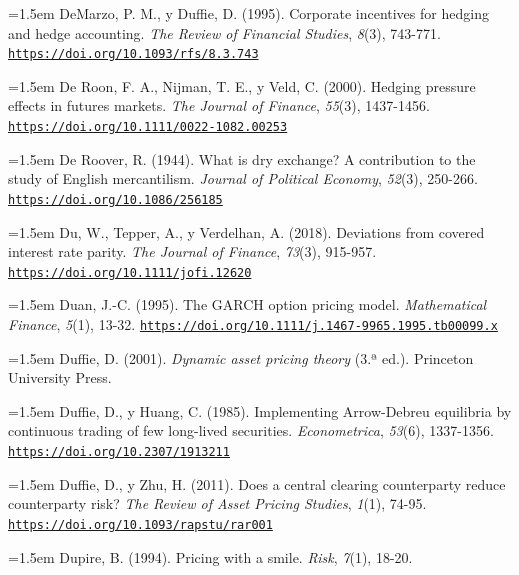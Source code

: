\documentclass[10pt,a4paper]{article}
\begin{document}
\noindent\hangindent=1.5em DeMarzo, P. M., y Duffie, D. (1995). Corporate incentives for hedging and hedge accounting. \textit{The Review of Financial Studies}, \textit{8}(3), 743-771. \href{https://doi.org/10.1093/rfs/8.3.743}{\nolinkurl{https://doi.org/10.1093/rfs/8.3.743}}

\noindent\hangindent=1.5em De Roon, F. A., Nijman, T. E., y Veld, C. (2000). Hedging pressure effects in futures markets. \textit{The Journal of Finance}, \textit{55}(3), 1437-1456. \href{https://doi.org/10.1111/0022-1082.00253}{\nolinkurl{https://doi.org/10.1111/0022-1082.00253}}

\noindent\hangindent=1.5em De Roover, R. (1944). What is dry exchange? A contribution to the study of English mercantilism. \textit{Journal of Political Economy}, \textit{52}(3), 250-266. \href{https://doi.org/10.1086/256185}{\nolinkurl{https://doi.org/10.1086/256185}}

\noindent\hangindent=1.5em Du, W., Tepper, A., y Verdelhan, A. (2018). Deviations from covered interest rate parity. \textit{The Journal of Finance}, \textit{73}(3), 915-957. \href{https://doi.org/10.1111/jofi.12620}{\nolinkurl{https://doi.org/10.1111/jofi.12620}}

\noindent\hangindent=1.5em Duan, J.-C. (1995). The GARCH option pricing model. \textit{Mathematical Finance}, \textit{5}(1), 13-32. \href{https://doi.org/10.1111/j.1467-9965.1995.tb00099.x}{\nolinkurl{https://doi.org/10.1111/j.1467-9965.1995.tb00099.x}}

\noindent\hangindent=1.5em Duffie, D. (2001). \textit{Dynamic asset pricing theory} (3.ª ed.). Princeton University Press.

\noindent\hangindent=1.5em Duffie, D., y Huang, C. (1985). Implementing Arrow-Debreu equilibria by continuous trading of few long-lived securities. \textit{Econometrica}, \textit{53}(6), 1337-1356. \href{https://doi.org/10.2307/1913211}{\nolinkurl{https://doi.org/10.2307/1913211}}

\noindent\hangindent=1.5em Duffie, D., y Zhu, H. (2011). Does a central clearing counterparty reduce counterparty risk? \textit{The Review of Asset Pricing Studies}, \textit{1}(1), 74-95. \href{https://doi.org/10.1093/rapstu/rar001}{\nolinkurl{https://doi.org/10.1093/rapstu/rar001}}

\noindent\hangindent=1.5em Dupire, B. (1994). Pricing with a smile. \textit{Risk}, \textit{7}(1), 18-20.
\end{document}
